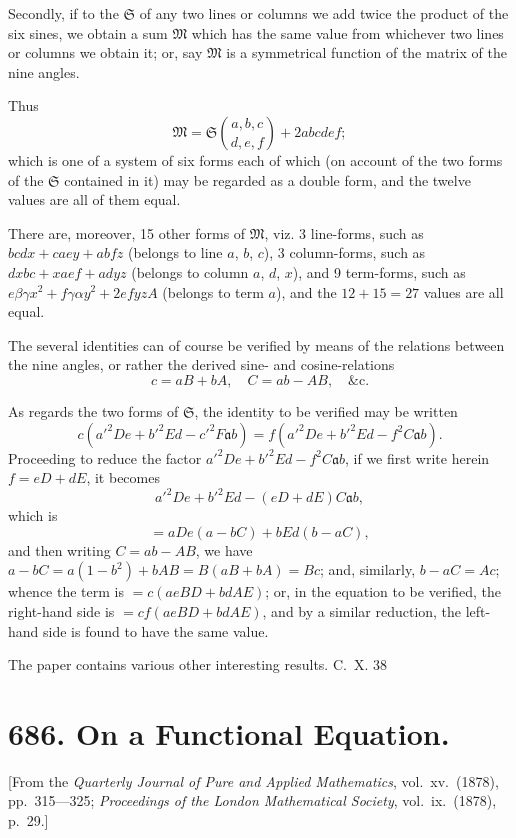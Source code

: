 \documentclass[11pt,a4paper]{book}
\begin{document}
Secondly, if to the $\mathfrak{S}$ of any two lines or columns we add twice the product of the six sines, we obtain a sum $\mathfrak{M}$ which has the same value from whichever two lines or columns we obtain it; or, say $\mathfrak{M}$ is a symmetrical function of the matrix of the nine angles.

Thus
\[
\mathfrak{M} = \mathfrak{S}\binom{a,b,c}{d,e,f} + 2abcdef;
\]
which is one of a system of six forms each of which (on account of the two forms of the $\mathfrak{S}$ contained in it) may be regarded as a double form, and the twelve values are all of them equal.

There are, moreover, 15 other forms of $\mathfrak{M}$, viz. 3 line-forms, such as $bcdx + caey + abfz$ (belongs to line $a$, $b$, $c$), 3 column-forms, such as $dxbc + xaef + adyz$ (belongs to column $a$, $d$, $x$), and 9 term-forms, such as $e\beta\gamma x^2 + f\gamma\alpha y^2 + 2efyz A$ (belongs to term $a$), and the $12 + 15 = 27$ values are all equal.

The several identities can of course be verified by means of the relations between the nine angles, or rather the derived sine- and cosine-relations
\[
c = aB + bA, \quad C = ab - AB, \quad \text{\&c.}
\]

As regards the two forms of $\mathfrak{S}$, the identity to be verified may be written
\[
c(a'^2 De + b'^2 Ed - c'^2 F\mathfrak{a}b) = f(a'^2 De + b'^2 Ed - f^2 C\mathfrak{a}b).
\]
Proceeding to reduce the factor $a'^2 De + b'^2 Ed - f^2 C\mathfrak{a}b$, if we first write herein $f = eD + dE$, it becomes
\[
a'^2 De + b'^2 Ed - (eD + dE)C\mathfrak{a}b,
\]
which is
\[
= aDe(a - bC) + bEd(b - aC),
\]
and then writing $C = ab - AB$, we have $a - bC = a(1 - b^2) + bAB = B(aB + bA) = Bc$; and, similarly, $b - aC = Ac$; whence the term is $= c(aeBD + bdAE)$; or, in the equation to be verified, the right-hand side is $= cf(aeBD + bdAE)$, and by a similar reduction, the left-hand side is found to have the same value.

The paper contains various other interesting results.
\hfill C.~X. 38

\newpage

\section*{686. On a Functional Equation.}

[From the \textit{Quarterly Journal of Pure and Applied Mathematics}, vol.\ xv.\ (1878), pp.\ 315---325; \textit{Proceedings of the London Mathematical Society}, vol.\ ix.\ (1878), p.\ 29.]
\end{document}

